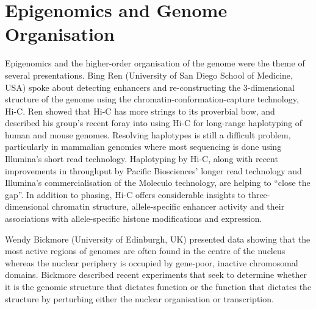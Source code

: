 \documentclass[twocolumn]{bmcart}%
\begin{document}





\section*{Epigenomics and Genome Organisation}

Epigenomics and the higher-order organisation of the genome were the theme of several presentations. Bing Ren (University of San Diego School of Medicine, USA) spoke about detecting enhancers and re-constructing the 3-dimensional structure of the genome using the chromatin-conformation-capture technology, Hi-C. Ren showed that Hi-C has more strings to its proverbial bow, and described his group's recent foray into using Hi-C for long-range haplotyping of human and mouse genomes. Resolving haplotypes is still a difficult problem, particularly in mammalian genomics where most sequencing is done using Illumina's short read technology. Haplotyping by Hi-C, along with recent improvements in throughput by Pacific Biosciences' longer read technology and Illumina's commercialisation of the Moleculo technology, are helping to ``close the gap''.  In addition to phasing, Hi-C offers considerable insights to three-dimensional chromatin structure, allele-specific enhancer activity and their associations with allele-specific histone modifications and expression.

Wendy Bickmore (University of Edinburgh, UK) presented data showing that the most active regions of genomes are often found in the centre of the nucleus whereas the nuclear periphery is occupied by gene-poor, inactive chromosomal domains. Bickmore described recent experiments that seek to determine whether it is the genomic structure that dictates function or the function that dictates the structure by perturbing either the nuclear organisation or transcription.
\end{document}
